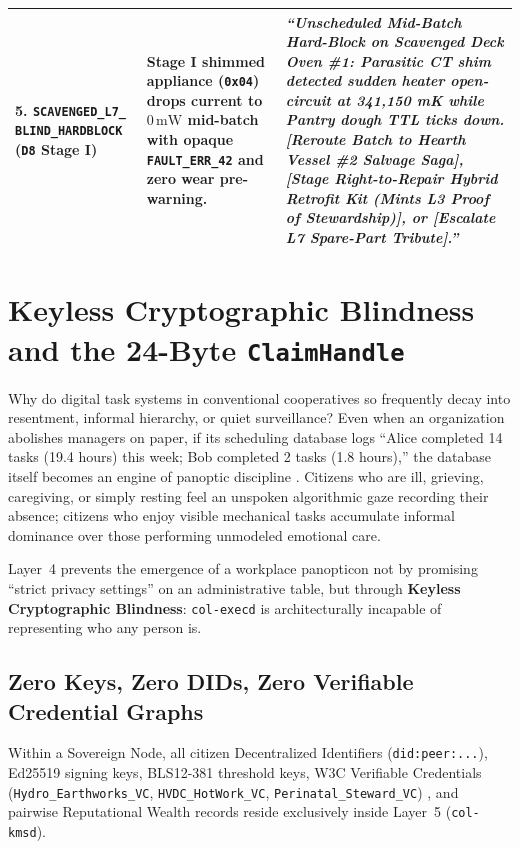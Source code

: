 \begin{table}[htbp]
{\begin{tabular}{@{}p{4.3cm}p{4.5cm}p{7.2cm}@{}}
\addlinespace
\textbf{5. \texttt{SCAVENGED\_L7\_}} \textbf{\texttt{BLIND\_HARDBLOCK}} (\texttt{D8} Stage I) & Stage I shimmed appliance (\texttt{0x04}) drops current to $0\,\mathrm{mW}$ mid-batch with opaque \texttt{FAULT\_ERR\_42} and zero wear pre-warning. & \textit{``Unscheduled Mid-Batch Hard-Block on Scavenged Deck Oven \#1: Parasitic CT shim detected sudden heater open-circuit at 341,150 mK while Pantry dough TTL ticks down. [Reroute Batch to Hearth Vessel \#2 Salvage Saga], [Stage Right-to-Repair Hybrid Retrofit Kit (Mints L3 Proof of Stewardship)], or [Escalate L7 Spare-Part Tribute].''} \\
\bottomrule
\end{tabular}%
}
\end{table}

\section{Keyless Cryptographic Blindness and the 24-Byte \texttt{ClaimHandle}}
\label{sec:ch1-keyless-blindness}

Why do digital task systems in conventional cooperatives so frequently decay into
resentment, informal hierarchy, or quiet surveillance? Even when an organization abolishes
managers on paper, if its scheduling database logs ``Alice completed 14 tasks (19.4 hours)
this week; Bob completed 2 tasks (1.8 hours),'' the database itself becomes an engine of
panoptic discipline \parencite{zuboff2019,freeman1972}. Citizens who are ill, grieving,
caregiving, or simply resting feel an unspoken algorithmic gaze recording their absence;
citizens who enjoy visible mechanical tasks accumulate informal dominance over those
performing unmodeled emotional care.

Layer~4 prevents the emergence of a workplace panopticon not by promising ``strict privacy
settings'' on an administrative table, but through \textbf{Keyless Cryptographic Blindness}:
\texttt{col-execd} is architecturally incapable of representing who any person is.

\subsection{Zero Keys, Zero DIDs, Zero Verifiable Credential Graphs}

Within a Sovereign Node, all citizen Decentralized Identifiers (\texttt{did:peer:...}),
Ed25519 signing keys, BLS12-381 threshold keys, W3C Verifiable Credentials
(\texttt{Hydro\_Earthworks\_VC}, \texttt{HVDC\_HotWork\_VC},
\texttt{Perinatal\_Steward\_VC}) \parencite{w3c2022vc}, and pairwise Reputational Wealth
records reside exclusively inside Layer~5 (\texttt{col-kmsd}).

